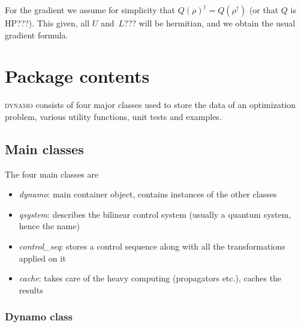 \documentclass[aps, pra, a4paper, longbibliography, superscriptaddress]{revtex4-1}
\newcommand{\DYNAMO}{\textsc{dynamo}}
\begin{document}
For the gradient we assume for simplicity that $Q(\rho)^\dagger = Q(\rho^\dagger)$ (or that $Q$ is HP???).
This given, all $U$ and~$L$??? will be hermitian, and we obtain the usual gradient formula.







\section{Package contents}

\DYNAMO{} consists of four major classes used to store the data of an
optimization problem, various utility functions, unit tests and examples.

\subsection{Main classes}

The four main classes are 
\begin{itemize}
\item
\emph{dynamo}: main container object, contains instances of the other classes

\item
\emph{qsystem}: describes the bilinear control system (usually a quantum system, hence the name)

\item
\emph{control\_seq}: stores a control sequence along with all the transformations applied on it

\item
\emph{cache}: takes care of the heavy computing (propagators etc.), caches the results
\end{itemize}

\subsubsection{Dynamo class}
\end{document}
